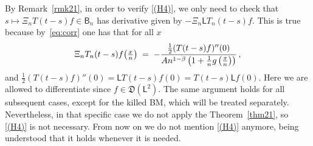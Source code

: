 \documentclass[12pt,a4paper]{article}
\theoremstyle{plain}
\theoremstyle{remark}
\newcommand{\msf}[1]{{\mathsf #1}}
\newcommand{\mf}[1]{{\mathfrak #1}}
\newcommand{\pfrac}[2]{\genfrac{}{}{}{1}{#1}{#2}}
\newcommand{\pn}[1]{\big(\pfrac{#1}{n}\big)}
\begin{document}
	By Remark~\ref{rmk21}, in order to verify \ref{(H4)}, we only need to check that $s \mapsto \Xi_n T(t-s)f\in \msf{B}_n$ has derivative given by $-\Xi_n \msf{L}T_n(t-s)f$. This is true because by~\eqref{eq:corr} one has that for all $x$ 
	\begin{equation*}
		\Xi_n T_n(t-s)f\pn{x}\; =\; -\frac{\frac{1}{2}(T(t-s)f)''(0)}{An^{1 - \beta}\left(1 + \frac{1}{n}g\left(\frac{x}{n}\right)\right)}\,,
	\end{equation*}
	and $\frac{1}{2}(T(t-s)f)''(0) = \msf{L}T(t-s)f(0) = T(t-s)\msf{L}f(0)$. Here we are allowed to differentiate since $f\in \mf D(\msf{L}^2)$. The same argument holds for all subsequent cases, except for the killed BM, which will be treated separately. Nevertheless, in that specific case we do not apply the Theorem~\ref{thm21}, so \ref{(H4)} is not necessary.  From now on we do not mention \ref{(H4)} anymore, being understood that it holds whenever it is needed.
	
\end{document}
